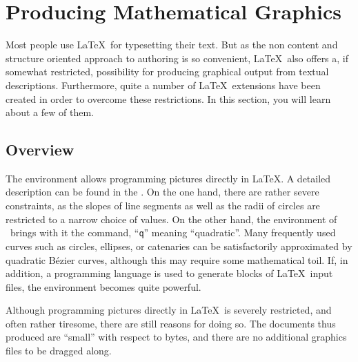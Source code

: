 \setcounter{chapter}{4}
\newcommand{\graphicscompanion}{\emph{The \LaTeX{} Graphics Companion}~\cite{graphicscompanion}} 
\newcommand{\hobby}{\emph{A User's Manual for \MP{}}~\cite{metapost}}
\newcommand{\hoenig}{\emph{\TeX{} Unbound}~\cite{unbound}}
\newcommand{\graphicsinlatex}{\emph{Graphics in \LaTeXe{}}~\cite{ursoswald}}

\chapter{Producing Mathematical Graphics}
\label{chap:graphics}

\begin{intro}
Most people use \LaTeX\ for typesetting their text. But as the non content and
structure oriented approach to authoring is so convenient, \LaTeX\ also offers a,
if somewhat restricted, possibility for producing graphical output from textual 
descriptions. Furthermore, quite a number of \LaTeX\ extensions have been created 
in order to overcome these restrictions. In this section, you will learn about a 
few of them.
\end{intro}

\section{Overview}

The  environment allows programming pictures directly in
\LaTeX. A detailed
description can be found in the \manual. On the one hand, there are rather
severe constraints, as the slopes of line segments as well as the radii of
circles are restricted to a narrow choice of values.  On the other hand, the
 environment of \LaTeXe\ brings with it the 
command, ``\texttt{q}'' meaning ``quadratic''.  Many frequently used curves
such as circles, ellipses, or catenaries can be satisfactorily approximated
by quadratic B\'ezier curves, although this may require some mathematical
toil. If, in addition, a programming language is used to generate
 blocks of \LaTeX\ input files, the  environment
becomes quite powerful.

Although programming pictures directly in \LaTeX\ is severely restricted,
and often rather tiresome, there are still reasons for doing so. The documents
thus produced are ``small'' with respect to bytes, and there are no additional
graphics files to be dragged along.

